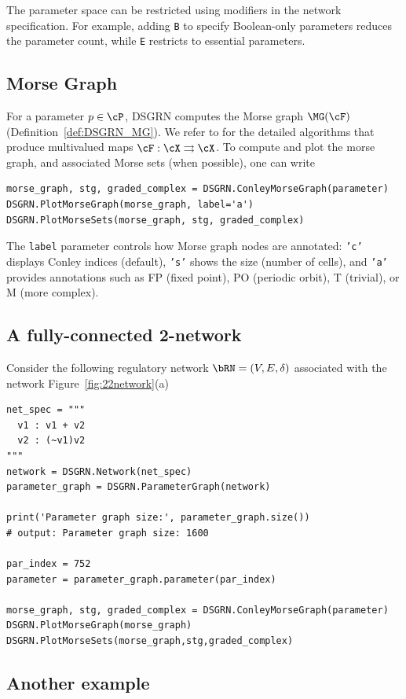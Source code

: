 The parameter space can be restricted using modifiers in the network specification. For example, adding \texttt{B} to specify Boolean-only parameters reduces the parameter count, while \texttt{E} restricts to essential parameters.

\subsection{Morse Graph}
For a parameter $p \in \cP$, DSGRN computes the Morse graph $\MG(\cF)$ (Definition~\ref{def:DSGRN_MG}). We refer to \cite{rook_field:24} for the detailed algorithms that produce multivalued maps $\cF : \cX \rightrightarrows \cX$. To compute and plot the morse graph, and associated Morse sets (when possible), one can write
\begin{verbatim}
morse_graph, stg, graded_complex = DSGRN.ConleyMorseGraph(parameter)
DSGRN.PlotMorseGraph(morse_graph, label='a')
DSGRN.PlotMorseSets(morse_graph, stg, graded_complex)
\end{verbatim}
The \texttt{label} parameter controls how Morse graph nodes are annotated: \texttt{'c'} displays Conley indices (default), \texttt{'s'} shows the size (number of cells), and \texttt{'a'} provides annotations such as FP (fixed point), PO (periodic orbit), T (trivial), or M (more complex).

\subsection{A fully-connected 2-network}

Consider the following regulatory network $\bRN=(V,E,\delta)$ associated with the network Figure~\ref{fig:22network}(a)

\begin{verbatim}
net_spec = """
  v1 : v1 + v2
  v2 : (~v1)v2
"""
network = DSGRN.Network(net_spec)
parameter_graph = DSGRN.ParameterGraph(network)

print('Parameter graph size:', parameter_graph.size())
# output: Parameter graph size: 1600

par_index = 752
parameter = parameter_graph.parameter(par_index)

morse_graph, stg, graded_complex = DSGRN.ConleyMorseGraph(parameter)
DSGRN.PlotMorseGraph(morse_graph)
DSGRN.PlotMorseSets(morse_graph,stg,graded_complex)
\end{verbatim}

\subsection{Another example}

